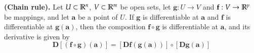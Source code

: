 \begin{theorem}
  \textbf{(Chain rule).} Let $U\subset \mathbb{R}^n$, $V\subset \mathbb{R}^m$ be open sets, let $\bm{g} : U \to V$ and $\textbf{f} : V \to \mathbb{R}^p$ be mappings, and let $\bm{a}$ be a point of $U$. If $\bm{g}$ is differentiable at $\bm{a}$ and $\bm{f}$ is differentiable at $\bm{g}(\bm{a})$, then the composition $\bm{f} \circ \bm{g}$ is differentiable at $\bm{a}$, and its derivative is given by
  \[\bm{D}[(\bm{f}\circ \bm{g})(\bm{a})]=[\bm{Df} (\bm{g}(\bm{a}))]\circ [\bm{Dg}(\bm{a})]\]
\end{theorem}
